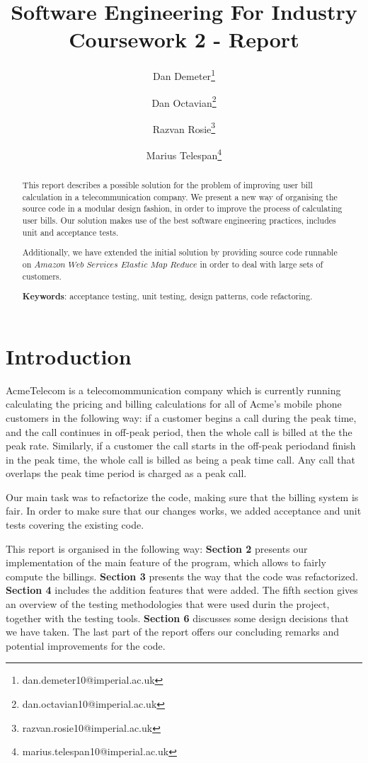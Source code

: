 \documentclass[11pt,twocolumn]{article} %
\title{Software Engineering For Industry \\ Coursework 2 - Report}
\author[1]{Dan Demeter\thanks{dan.demeter10@imperial.ac.uk}}
\author[1]{Dan Octavian\thanks{dan.octavian10@imperial.ac.uk}}
\author[1]{Razvan Rosie\thanks{razvan.rosie10@imperial.ac.uk}}
\author[1]{Marius Telespan\thanks{marius.telespan10@imperial.ac.uk}}
\affil[1]{Department of Computing, Imperial College London}
\begin{document}
\maketitle

\begin{abstract}
This report describes a possible solution for the problem of improving user bill calculation in a telecommunication company. 
We present a new way of organising the source code in a modular design fashion, in order to improve the process of calculating user bills. Our solution makes use of the best software engineering practices, includes unit and acceptance tests.

Additionally, we have extended the initial solution by providing source code runnable on $Amazon$ $Web$ $Services$ $Elastic$ $Map$ $Reduce$ in order to deal with large sets of customers.
\newline

{\bf Keywords}: acceptance testing, unit testing, design patterns, code refactoring.
\end{abstract}


\section{Introduction}
AcmeTelecom is a telecomommunication company which is currently running calculating the pricing and billing calculations
for all of Acme's mobile phone customers in the following way: if a customer begins a call during the peak time, and the call 
continues in off-peak period, then the whole call is billed at the the peak rate. Similarly, if a customer the call starts in 
the off-peak periodand finish in the peak time, the whole call is billed as being a peak time call. Any call that overlaps the 
peak time period is charged as a peak call.


Our main task was to refactorize the code, making sure that the billing system is fair. In order to make sure that our changes works,
we added acceptance and unit tests covering the existing code.

This report is organised in the following way: {\bf Section 2} presents our implementation of the main feature of the program, which
allows to fairly compute the billings. {\bf Section 3} presents the way that the code was refactorized. 
{\bf Section 4} includes the addition features that were added. 
The fifth section gives an overview of the testing methodologies that were used durin the project, together with the testing tools.
{\bf Section 6} discusses some design decisions that we have taken.
The last part of the report offers our concluding remarks and potential improvements for the code.
\end{document}
